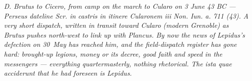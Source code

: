 
\textit{D. Brutus to Cicero, from camp on the march to
Cularo on 3 June 43 BC --- Perseus dateline \textit{Scr.
in castris in itinere Cularonem iii Non. Iun. a. 711 (43)}.
A very short dispatch, written in transit toward Cularo
(modern Grenoble) as Brutus pushes north-west to link up
with Plancus. By now the news of Lepidus's defection on
30~May has reached him, and the field-dispatch register
has gone hard: brought-up legions, money or its decree,
good faith and speed in the messengers --- everything
quartermasterly, nothing rhetorical. The \textit{ista quae
acciderunt} that he had foreseen is Lepidus.}
